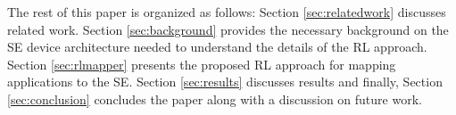 The rest of this paper is organized as follows: 
Section \ref{sec:relatedwork} discusses related work.
Section \ref{sec:background} provides the necessary background on the SE device architecture needed to understand the details of the RL approach.
Section \ref{sec:rlmapper} presents the proposed RL approach for mapping applications to the SE.
Section \ref{sec:results} discusses results and finally, Section \ref{sec:conclusion} concludes the paper along with a discussion on future work.